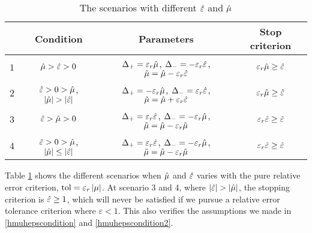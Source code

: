 \documentclass{iitthesis}
\theoremstyle{definition}
\begin{document}
\begin{table}[ht]
\caption{The scenarios with different $\hat{\varepsilon}$ and $\hat{\mu}$ \label{scenariosprop} }
\begin{tabular}{c|c|c|c}
      \hline
      \hline
       & Condition & Parameters & Stop criterion\\
      \hline 
     $1$ & $\hat{\mu} > \hat{\varepsilon} >0$ &  $\Delta_+ = \varepsilon_r\hat{\mu}$, $\Delta_- = -\varepsilon_r\hat{\varepsilon}$, 
     $\tilde{\mu} = \hat{\mu}-\varepsilon_r\hat{\varepsilon}$ & $\varepsilon_r\hat{\mu} \geq \hat{\varepsilon}$\\
         $2$ &  $\hat{\varepsilon} > 0 >\hat{\mu}$, $\left \lvert \hat{\mu} \right \rvert >\left \lvert \hat{\varepsilon} \right \rvert$ &  $\Delta_+ = -\varepsilon_r\hat{\mu}$, $\Delta_- = \varepsilon_r\hat{\varepsilon}$, 
     $\tilde{\mu} = \hat{\mu}+\varepsilon_r\hat{\varepsilon}$ & $\varepsilon_r\hat{\mu} \geq \hat{\varepsilon}$\\
         $3$ & $\hat{\varepsilon} > \hat{\mu} >0$ &  $\Delta_+ = \varepsilon_r\hat{\varepsilon}$, $\Delta_- = -\varepsilon_r\hat{\mu}$, 
     $\tilde{\mu} = \hat{\mu}-\varepsilon_r\hat{\mu}$ & $\varepsilon_r\hat{\varepsilon} \geq \hat{\varepsilon}$\\
          $4$  & $\hat{\varepsilon} > 0 >\hat{\mu}$, $\left \lvert \hat{\mu} \right \rvert \leq \left \lvert \hat{\varepsilon} \right \rvert$ &  $\Delta_+ = \varepsilon_r\hat{\varepsilon}$, $\Delta_- = -\varepsilon_r\hat{\mu}$, 
     $\tilde{\mu} = \hat{\mu}-\varepsilon_r\hat{\mu}$ & $\varepsilon_r\hat{\varepsilon} \geq \hat{\varepsilon}$\\
      \hline
    \end{tabular}
\end{table}


Table \ref{scenariosprop} shows the different scenarios when $\hat{\mu}$ and $\hat{\varepsilon}$ varies with the pure relative error criterion, $\operatorname{tol} = \varepsilon_r\left \lvert \mu \right \rvert$. At scenario 3 and 4, where $\left \lvert \hat{\varepsilon} \right \rvert> \left \lvert \hat{\mu} \right \rvert$, the stopping criterion is $\hat{\varepsilon} \geq 1$, which will never be satisfied if we pursue a relative error tolerance criterion where $\varepsilon<1$. This also verifies the assumptions we made in \eqref{hmuhepscondition} and \eqref{hmuhepscondition2}.
\end{document}
